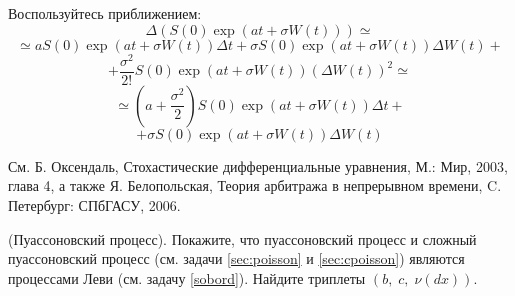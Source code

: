 \begin{remark}
Воспользуйтесь приближением:
\[
\Delta \left( {S\left( 0 \right)\exp 
\left( {at+\sigma W\left( t \right)} \right)} \right)\simeq 
\]
\[
\simeq aS\left( 0 \right)\exp \left( {at+\sigma W\left( t \right)} 
\right)\Delta t+\sigma S\left( 0 \right)\exp \left( {at+\sigma W\left( t 
\right)} \right)\Delta W\left( t \right)+
\]
\[
+\frac{\sigma ^2}{2!}S\left( 0 \right)\exp \left( {at+\sigma W\left( t 
\right)} \right)\left( {\Delta W\left( t \right)} \right)^2\simeq 
\]
\[
\simeq \left( {a+\frac{\sigma ^2}{2}} \right)S\left( 0 \right)\exp \left( 
{at+\sigma W\left( t \right)} \right)\Delta t + 
\]
\[+\sigma S\left( 0 \right)\exp 
\left( {at+\sigma W\left( t \right)} \right)\Delta W\left( t \right)
\]

См. Б. Оксендаль, Стохастические 
дифференциальные уравнения, М.: Мир, 2003, глава 4, а также 
Я. Белопольская, Теория арбитража в непрерывном времени, C. Петербург: СПбГАСУ, 2006.
\end{remark}


\begin{problem}(Пуассоновский процесс). Покажите, что 
пуассоновский процесс и сложный пуассоновский процесс (см. задачи \ref{sec:poisson} и \ref{sec:cpoisson}) 
являются процессами Леви (см. задачу \ref{sobord}). Найдите триплеты $\left( {b,\;c,\;\nu \left( {dx} 
\right)} \right)$.
\end{problem}

